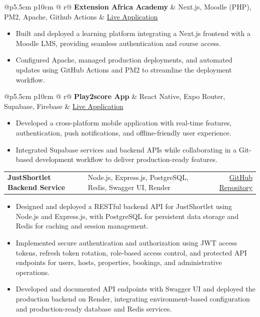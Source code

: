 \documentclass{article}
\makeatletter
\newcommand{\contactinfo}[1]{{\fontsize{11pt}{13pt}\selectfont\color{black!70}#1}}
\newcommand{\project}[3]{%
    \noindent
    \begin{tabular*}{\linewidth}{@{}p{5.5cm} p{10cm} @{\extracolsep{\fill}} r@{}}
        \textbf{#1} & {#2} & {\color{linkcolor}\small #3}
    \end{tabular*}
}
\makeatother
\begin{document}
\project{{Extension Africa Academy}}{ Next.js, Moodle (PHP), PM2, Apache, Github Actions  }{\contactinfo{ \href{https://academy.extensionafrica.com}{Live Application}}}
\vspace{-0.4cm}
\begin{itemize}
    \item Built and deployed a learning platform integrating a Next.js frontend with a Moodle LMS, providing seamless authentication and course access.
    \item Configured Apache, managed production deployments, and automated updates using GitHub Actions and PM2 to streamline the deployment workflow.
\end{itemize}

\project{{Play2score App}}{ React Native, Expo Router, Supabase, Firebase }{\contactinfo{ \href{https://play2score.net}{Live Application}}}
\vspace{-0.4cm}
\begin{itemize}
    \item Developed a cross-platform mobile application with real-time features, authentication, push notifications, and offline-friendly user experience.
    \item Integrated Supabase services and backend APIs while collaborating in a Git-based development workflow to deliver production-ready features.
\end{itemize}

\project{{JustShortlet Backend Service}}{ Node.js, Express.js, PostgreSQL, Redis, Swagger UI, Render }{\contactinfo{ \href{https://github.com/Hardeygold205/justshortlet-api}{GitHub Repository}}}
\vspace{-0.4cm}
\begin{itemize}
\item Designed and deployed a RESTful backend API for JustShortlet using Node.js and Express.js, with PostgreSQL for persistent data storage and Redis for caching and session management.
\item Implemented secure authentication and authorization using JWT access tokens, refresh token rotation, role-based access control, and protected API endpoints for users, hosts, properties, bookings, and administrative operations.
\item Developed and documented API endpoints with Swagger UI and deployed the production backend on Render, integrating environment-based configuration and production-ready database and Redis services.
\end{itemize}
\end{document}
